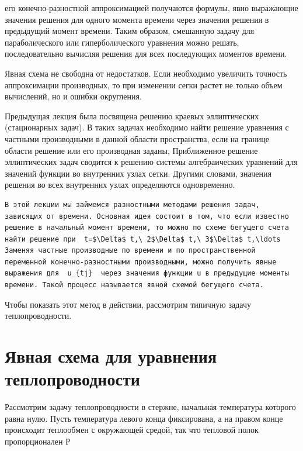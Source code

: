 \documentclass[
  ukrainian,
]{article}
\begin{document}
его конечно-разностной аппроксимацией получаются формулы, явно
выражающие значения решения для одного момента времени через значения
решения в предыдущий момент времени. Таким образом, смешанную задачу для
параболического или гиперболического уравнения можно решать,
последовательно вычисляя решения для всех последующих моментов времени.

Явная схема не свободна от недостатков. Если необходимо увеличить
точность аппроксимации производных, то при изменении сегки растет не
только объем вычислений, но и ошибки округления.

Предыдущая лекция была посвящена решению краевых эллиптических
(стационарных задач). В таких задачах необходимо найти решение уравнения
с частными производными в данной области пространства, если на границе
области решение или его производная заданы, Приближенное решение
эллиптических задач сводится к решению системы алгебраических уравнений
для значений функции во внутренних узлах сетки. Другими словами,
значения решения во всех внутренних узлах определяются одновременно.

\begin{verbatim}
В этой лекции мы займемся разностными методами решения задач, зависящих от времени. Основная идея состоит в том, что если известно решение в начальный момент времени, то можно по схеме бегущего счета найти решение при  t=$\Delta$ t,\ 2$\Delta$ t,\ 3$\Delta$ t,\ldots  Заменяя частные производные по времени и по пространственной переменной конечно-разностными производными, можно получить явные выражения для  u_{tj}  через значения функции u в предыдущие моменты времени. Такой процесс называется явной схемой бегущего счета.
\end{verbatim}

Чтобы показать этот метод в действии, рассмотрим типичную задачу
теплопроводности.

\section{Явная схема для уравнения
теплопроводности}\label{ux44fux432ux43dux430ux44f-ux441ux445ux435ux43cux430-ux434ux43bux44f-ux443ux440ux430ux432ux43dux435ux43dux438ux44f-ux442ux435ux43fux43bux43eux43fux440ux43eux432ux43eux434ux43dux43eux441ux442ux438}

Рассмотрим задачу теплопроводности в стержне, начальная температура
которого равна нулю. Пусть температура левого конца фиксирована, а на
правом конце происходит теплообмен с окружающей средой, так что тепловой
полок пропорционален Р
\end{document}
